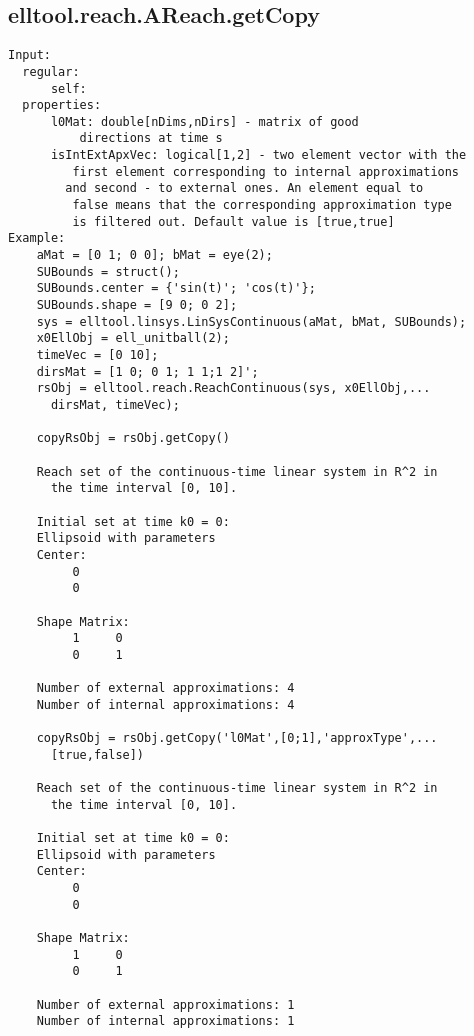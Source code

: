 \subsection{\texorpdfstring{elltool.reach.AReach.getCopy}{getCopy}}\label{method:elltool.reach.AReach.getCopy}
\begin{verbatim}
Input:
  regular:
      self:
  properties:
      l0Mat: double[nDims,nDirs] - matrix of good
          directions at time s
      isIntExtApxVec: logical[1,2] - two element vector with the
         first element corresponding to internal approximations
        and second - to external ones. An element equal to
         false means that the corresponding approximation type
         is filtered out. Default value is [true,true]
Example:
    aMat = [0 1; 0 0]; bMat = eye(2);
    SUBounds = struct();
    SUBounds.center = {'sin(t)'; 'cos(t)'};
    SUBounds.shape = [9 0; 0 2];
    sys = elltool.linsys.LinSysContinuous(aMat, bMat, SUBounds);
    x0EllObj = ell_unitball(2);
    timeVec = [0 10];
    dirsMat = [1 0; 0 1; 1 1;1 2]';
    rsObj = elltool.reach.ReachContinuous(sys, x0EllObj,...
      dirsMat, timeVec);

    copyRsObj = rsObj.getCopy()

    Reach set of the continuous-time linear system in R^2 in
      the time interval [0, 10].

    Initial set at time k0 = 0:
    Ellipsoid with parameters
    Center:
         0
         0

    Shape Matrix:
         1     0
         0     1

    Number of external approximations: 4
    Number of internal approximations: 4

    copyRsObj = rsObj.getCopy('l0Mat',[0;1],'approxType',...
      [true,false])

    Reach set of the continuous-time linear system in R^2 in
      the time interval [0, 10].

    Initial set at time k0 = 0:
    Ellipsoid with parameters
    Center:
         0
         0

    Shape Matrix:
         1     0
         0     1

    Number of external approximations: 1
    Number of internal approximations: 1
\end{verbatim}
